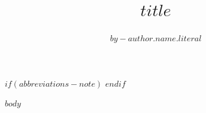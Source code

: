 \documentclass[$for(classoption)$$classoption$$sep$,$endfor$]{WileyNJDv5}
\title{$title$}
\author[$for(by-author.affiliations)$$it.number$$sep$,$endfor$]{$by-author.name.literal$}
\begin{document}
\maketitle

$if(abbreviations-note)$
\renewcommand\thefootnote{}
\renewcommand\thefootnote{\fnsymbol{footnote}}
\setcounter{footnote}{1}
$endif$

$body$


\end{document}
